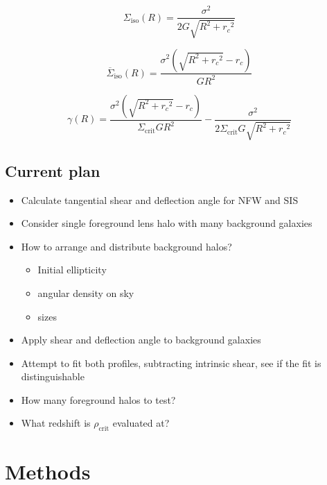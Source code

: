 \documentclass[]{article}
\begin{document}
\begin{equation}
    \Sigma_\mathrm{iso}(R) = \frac{\sigma^2}{2 G \sqrt{R^2 + {r_c}^2}}
\end{equation}

\begin{equation}
    \overline{\Sigma}_\mathrm{iso}(R) = \frac{\sigma^2 \left(\sqrt{R^2 + {r_c}^2} - r_c \right)}{G R^2}
\end{equation}

\begin{equation}
    \gamma(R) = \frac{\sigma^2 \left(\sqrt{R^2 + {r_c}^2} - r_c \right)}{\Sigma_\mathrm{crit} G R^2} - \frac{\sigma^2}{2 \Sigma_\mathrm{crit} G \sqrt{R^2 + {r_c}^2}}
\end{equation}




\subsection{Current plan}
\begin{itemize}
    \item Calculate tangential shear and deflection angle for NFW and SIS
    \item Consider single foreground lens halo with many background galaxies
    \item How to arrange and distribute background halos?
    \begin{itemize}
        \item Initial ellipticity
        \item angular density on sky
        \item sizes
    \end{itemize}
    \item Apply shear and deflection angle to background galaxies
    \item Attempt to fit both profiles, subtracting intrinsic shear, see if the fit is distinguishable
    \item How many foreground halos to test?
    \item What redshift is $\rho_\mathrm{crit}$ evaluated at?

\end{itemize}



\section{Methods}
\end{document}
